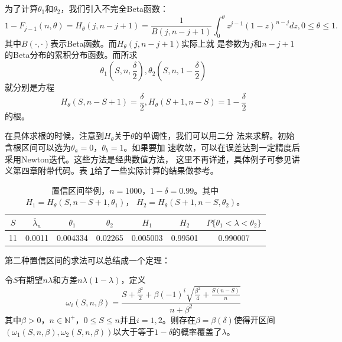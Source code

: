 为了计算$\theta_1$和$\theta_2$，我们引入不完全Beta函数\cite{Abramowitz1970Handbook}：
\begin{equation}
  1 - F_{j - 1}(n, \theta) = H_\theta(j, n - j + 1) = \frac{1}{B(j, n
    - j + 1)}\int_0^\theta z^{j - 1}(1 - z)^{n - j} dz, 0 \leq \theta \leq 1.
  \label{eq::incomplete_beta}
\end{equation}
其中$B(\cdot, \cdot)$表示Beta函数。而$H_\theta(j, n - j + 1)$实际上就
是参数为$j$和$n - j + 1$的Beta分布的累积分布函数。而所求
$$
\theta_1(S, n, \frac{\delta}{2}), \theta_2(S, n, 1 - \frac{\delta}{2})
$$
就分别是方程
$$
H_\theta(S, n - S + 1) = \frac{\delta}{2},
H_\theta(S + 1, n - S) = 1 - \frac{\delta}{2}
$$
的根。

在具体求根的时候，注意到$H_\theta$关于$\theta$的单调性，我们可以用二分
法来求解。初始含根区间可以选为$\theta_a = 0$，$\theta_b = 1$。如果要加
速收敛，可以在误差达到一定精度后采用Newton迭代。这些方法是经典数值方法，
这里不再详述，具体例子可参见讲义第四章附带代码。表
\ref{table::confidence_intervals}给了一些实际计算的结果做参考。

 \begin{table}[!ht]
   \centering
   \caption{置信区间举例，$n = 1000$，$1 - \delta = 0.99$。其中
     $H_1 = H_\theta(S, n - S + 1, \theta_1)$，
     $H_2 = H_\theta(S + 1, n - S, \theta_2)$。}
   \label{table::confidence_intervals}
\begin{tabular}{|c|c|c|c|c|c|c|}
  \hline
  $S$ & $\bar{\lambda}_n$ & $\theta_1$ & $\theta_2$&
  $H_1$&$H_2$&
  $P\{\theta_1 < \lambda < \theta_2\}$\\
  \hline
  11&0.0011&0.004334&0.02265& 0.005003&0.99501&0.990007\\
  \hline
\end{tabular}
\end{table}

第二种置信区间的求法可以总结成一个定理：


\begin{theorem}{}
  令$S$有期望$n \lambda$和方差$n \lambda(1 - \lambda)$，定义
  \begin{equation}
    \omega_i(S, n, \beta) = \frac{S + \frac{\beta^2}{2} +
      \beta(-1)^i\sqrt{\frac{\beta^2}{4} + \frac{S(n - S)}{n}}}{n +
      \beta^2}
    \label{eq::conf_int2}
  \end{equation}
  其中$\beta > 0$，$n \in \mathbb{N}^+$，$0 \leq S \leq n$并且$i = 1,
  2$。则存在$\beta = \beta(\delta)$使得开区间$(\omega_1(S, n, \beta),
  \omega_2(S, n, \beta))$以大于等于$1 - \delta$的概率覆盖了$\lambda$。
  \label{thm::conf_int2}
\end{theorem}

